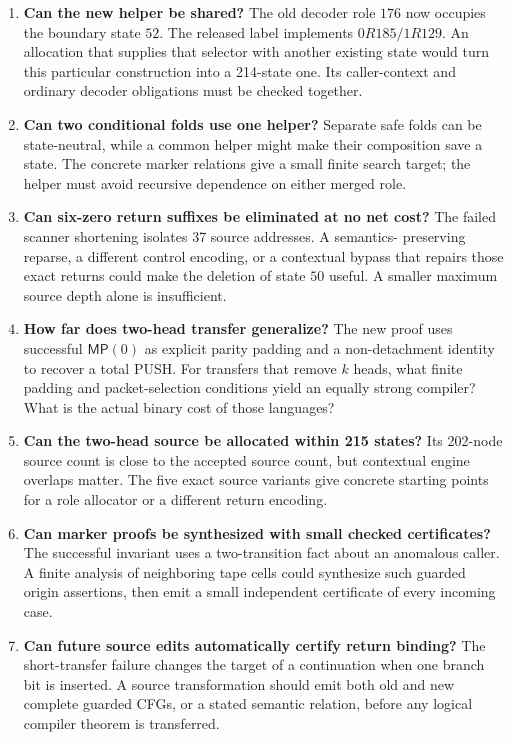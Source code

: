 \documentclass[11pt]{article}
\theoremstyle{definition}\newtheorem{definition}[theorem]{Definition}
\theoremstyle{remark}\newtheorem{remark}[theorem]{Remark}
\newcommand{\MP}{\mathsf{MP}}
\begin{document}
\begin{enumerate}
\item \textbf{Can the new helper be shared?} The old decoder role $176$
now occupies the boundary state $52$. The released label implements
$0R185/1R129$. An allocation that supplies that selector with another
existing state would turn this particular construction into a 214-state
one. Its caller-context and ordinary decoder obligations must be checked
together.

\item \textbf{Can two conditional folds use one helper?} Separate safe
folds can be state-neutral, while a common helper might make their
composition save a state. The concrete marker relations give a small
finite search target; the helper must avoid recursive dependence on either
merged role.

\item \textbf{Can six-zero return suffixes be eliminated at no net cost?}
The failed scanner shortening isolates 37 source addresses. A semantics-
preserving reparse, a different control encoding, or a contextual bypass
that repairs those exact returns could make the deletion of state $50$
useful. A smaller maximum source depth alone is insufficient.

\item \textbf{How far does two-head transfer generalize?} The new proof
uses successful $\MP(0)$ as explicit parity padding and a non-detachment
identity to recover a total PUSH. For transfers that remove $k$ heads,
what finite padding and packet-selection conditions yield an equally
strong compiler? What is the actual binary cost of those languages?

\item \textbf{Can the two-head source be allocated within 215 states?}
Its 202-node source count is close to the accepted source count, but
contextual engine overlaps matter. The five exact source variants give
concrete starting points for a role allocator or a different return
encoding.

\item \textbf{Can marker proofs be synthesized with small checked
certificates?} The successful invariant uses a two-transition fact about
an anomalous caller. A finite analysis of neighboring tape cells could
synthesize such guarded origin assertions, then emit a small independent
certificate of every incoming case.

\item \textbf{Can future source edits automatically certify return
binding?} The short-transfer failure changes the target of a continuation
when one branch bit is inserted. A source transformation should emit
both old and new complete guarded CFGs, or a stated semantic relation,
before any logical compiler theorem is transferred.


\end{enumerate}
\end{document}
